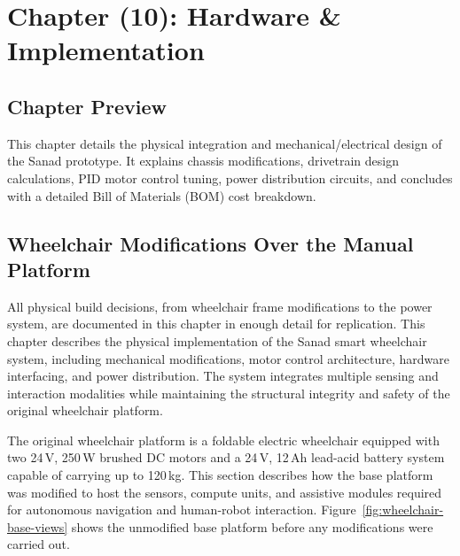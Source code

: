 
\setcounter{chapter}{10}
\chapter*{Chapter (10): Hardware \& Implementation}
\setcounter{section}{0}

\section{Chapter Preview}
This chapter details the physical integration and mechanical/electrical design of the Sanad prototype. It explains chassis modifications, drivetrain design calculations, PID motor control tuning, power distribution circuits, and concludes with a detailed Bill of Materials (BOM) cost breakdown.

\section{Wheelchair Modifications Over the Manual Platform}
All physical build decisions, from wheelchair frame modifications to the power system, are documented in this chapter in enough detail for replication. This chapter describes the physical implementation of the Sanad smart wheelchair system, including mechanical modifications, motor control architecture, hardware interfacing, and power distribution. The system integrates multiple sensing and interaction modalities while maintaining the structural integrity and safety of the original wheelchair platform.

The original wheelchair platform is a foldable electric wheelchair equipped with two 24\,V, 250\,W brushed DC motors and a 24\,V, 12\,Ah lead-acid battery system capable of carrying up to 120\,kg. This section describes how the base platform was modified to host the sensors, compute units, and assistive modules required for autonomous navigation and human-robot interaction. Figure~\ref{fig:wheelchair-base-views} shows the unmodified base platform before any modifications were carried out.

